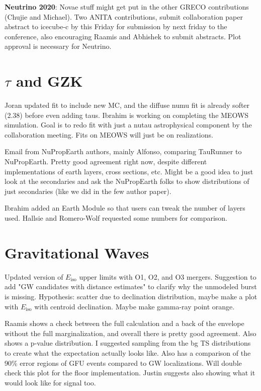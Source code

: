 \textbf{Neutrino 2020}: Novae stuff might get put in the other GRECO contributions (Chujie and Michael). Two ANITA contributions, submit collaboration paper abstract to icecube-c by this Friday for submission by next friday to the conference, also encouraging Raamis and Abhishek to submit abstracts. Plot approval is necessary for Neutrino. 

\section{$\tau$ and GZK}
Joran updated fit to include new MC, and the diffuse numu fit is already softer (2.38) before even adding taus. Ibrahim is working on completing the MEOWS simulation. Goal is to redo fit with just a nutau astrophysical component by the collaboration meeting. Fits on MEOWS will just be on realizations.

Email from NuPropEarth authors, mainly Alfonso, comparing TauRunner to NuPropEarth. Pretty good agreement right now, despite different implementations of earth layers, cross sections, etc. Might be a good idea to just look at the secondaries and ask the NuPropEarth folks to show distributions of just secondaries (like we did in the few author paper). 

Ibrahim added an Earth Module so that users can tweak the number of layers used. Hallsie and Romero-Wolf requested some numbers for comparison.

\section{Gravitational Waves}
Updated version of $E_{\mathrm{iso}}$ upper limits with O1, O2, and O3 mergers. Suggestion to add "GW candidates with distance estimates" to clarify why the unmodeled burst is missing. Hypothesis: scatter due to declination distribution, maybe make a plot with $E_{\mathrm{iso}}$ with centroid declination. Maybe make gamma-ray point orange. 

Raamis shows a check between the full calculation and a back of the envelope without the full marginalization, and overall there is pretty good agreement. Also shows a p-value distribution. I suggested sampling from the bg TS distributions to create what the expectation actually looks like. Also has a comparison of the 90\% error regions of GFU events compared to GW localizations. Will double check this plot for the floor implementation. Justin suggests also showing what it would look like for signal too. 

